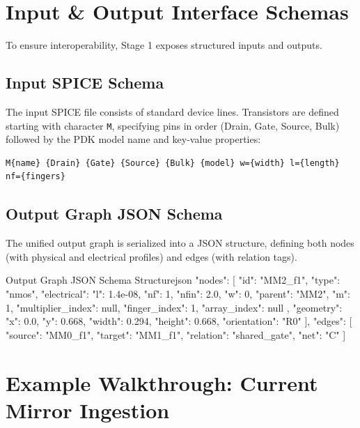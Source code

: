 \section[I/O Schemas]{Input \& Output Interface Schemas}
\label{sec:io_schemas}

To ensure interoperability, Stage 1 exposes structured inputs and outputs.

\subsection{Input SPICE Schema}
The input SPICE file consists of standard device lines. Transistors are defined starting with character \texttt{M}, specifying pins in order (Drain, Gate, Source, Bulk) followed by the PDK model name and key-value properties:
\begin{lstlisting}[language=text]
M{name} {Drain} {Gate} {Source} {Bulk} {model} w={width} l={length} nf={fingers}
\end{lstlisting}

\subsection{Output Graph JSON Schema}
The unified output graph is serialized into a JSON structure, defining both nodes (with physical and electrical profiles) and edges (with relation tags).

\begin{thesiscode}{Output Graph JSON Schema Structure}{json}
{
  "nodes": [
    {
      "id": "MM2_f1",
      "type": "nmos",
      "electrical": {
        "l": 1.4e-08,
        "nf": 1,
        "nfin": 2.0,
        "w": 0,
        "parent": "MM2",
        "m": 1,
        "multiplier_index": null,
        "finger_index": 1,
        "array_index": null
      },
      "geometry": {
        "x": 0.0,
        "y": 0.668,
        "width": 0.294,
        "height": 0.668,
        "orientation": "R0"
      }
    }
  ],
  "edges": [
    {
      "source": "MM0_f1",
      "target": "MM1_f1",
      "relation": "shared_gate",
      "net": "C"
    }
  ]
}
\end{thesiscode}

\section[Example Walkthrough]{Example Walkthrough: Current Mirror Ingestion}
\label{sec:example_walkthrough}

